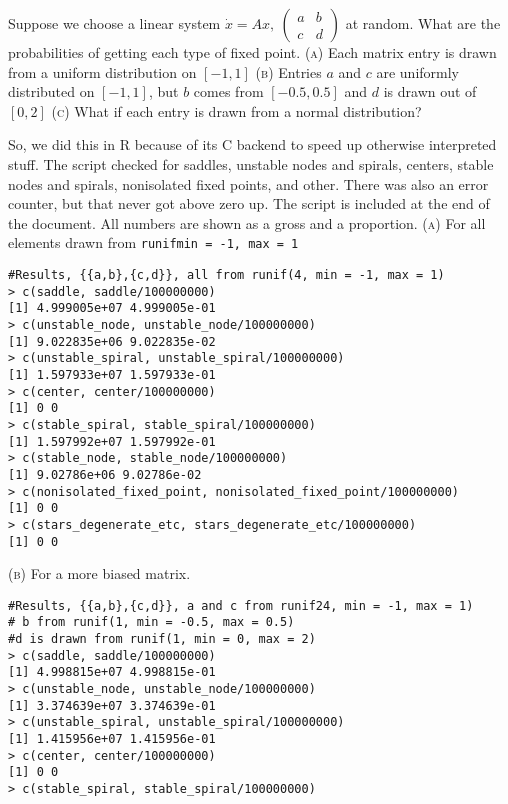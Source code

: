 \documentclass[11pt,answers]{exam}
\begin{document}
\begin{questions}
\item Suppose we choose a linear system $\displaystyle \dot{x} = Ax, \: \left(\begin{array}{cc} a & b \\ c & d \end{array} \right)$ at random.  What are the probabilities of getting each type of fixed point.
\newline\textsc{(a)} Each matrix entry is drawn from a uniform distribution on $[-1, 1]$
\newline\textsc{(b)} Entries $a$ and $c$ are uniformly distributed on $[-1, 1]$, but $b$ comes from $[-0.5, 0.5]$ and $d$ is drawn out of $[0, 2]$
\newline\textsc{(c)} What if each entry is drawn from a normal distribution?
\begin{solution}
So, we did this in R because of its C backend to speed up otherwise interpreted stuff.  The script checked for saddles, unstable nodes and spirals, centers, stable nodes and spirals, nonisolated fixed points, and other.  There was also an error counter, but that never got above zero up.  The script is included at the end of the document.  All numbers are shown as a gross and a proportion.
\newline\textsc{(a)} For all elements drawn from \texttt{runif{min = -1, max = 1}}
\begin{verbatim}
#Results, {{a,b},{c,d}}, all from runif(4, min = -1, max = 1)
> c(saddle, saddle/100000000)
[1] 4.999005e+07 4.999005e-01
> c(unstable_node, unstable_node/100000000)
[1] 9.022835e+06 9.022835e-02
> c(unstable_spiral, unstable_spiral/100000000)
[1] 1.597933e+07 1.597933e-01
> c(center, center/100000000)
[1] 0 0
> c(stable_spiral, stable_spiral/100000000)
[1] 1.597992e+07 1.597992e-01
> c(stable_node, stable_node/100000000)
[1] 9.02786e+06 9.02786e-02
> c(nonisolated_fixed_point, nonisolated_fixed_point/100000000)
[1] 0 0
> c(stars_degenerate_etc, stars_degenerate_etc/100000000)
[1] 0 0
\end{verbatim}
\textsc{(b)} For a more biased matrix.
\begin{verbatim}
#Results, {{a,b},{c,d}}, a and c from runif24, min = -1, max = 1)
# b from runif(1, min = -0.5, max = 0.5) 
#d is drawn from runif(1, min = 0, max = 2)
> c(saddle, saddle/100000000)
[1] 4.998815e+07 4.998815e-01
> c(unstable_node, unstable_node/100000000)
[1] 3.374639e+07 3.374639e-01
> c(unstable_spiral, unstable_spiral/100000000)
[1] 1.415956e+07 1.415956e-01
> c(center, center/100000000)
[1] 0 0
> c(stable_spiral, stable_spiral/100000000)

\end{verbatim}
\end{solution}
\end{questions}
\end{document}
